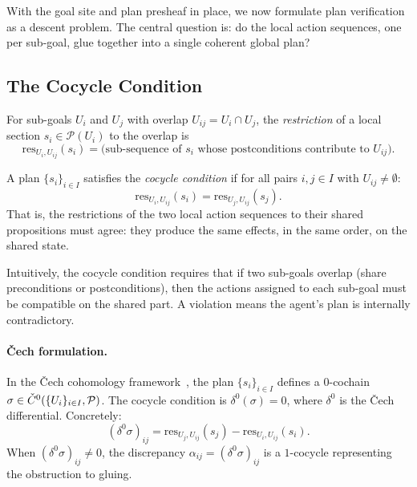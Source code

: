 \documentclass[11pt]{article}
\newcommand{\PlanSheaf}{\mathcal{P}}
\newcommand{\SubGoal}[1]{U_{#1}}
\newcommand{\CoverFam}{\{U_i\}_{i \in I}}
\newcommand{\PlanRes}{\mathrm{res}}
\begin{document}
With the goal site and plan presheaf in place, we now formulate
plan verification as a descent problem.  The central question is:
do the local action sequences, one per sub-goal, glue together
into a single coherent global plan?

\subsection{The Cocycle Condition}\label{ssec:cocycle}

\begin{definition}\label{def:restriction}
  For sub-goals $\SubGoal{i}$ and $\SubGoal{j}$ with overlap
  $\SubGoal{ij} = \SubGoal{i} \cap \SubGoal{j}$, the
  \emph{restriction} of a local section $s_i \in \PlanSheaf(\SubGoal{i})$
  to the overlap is
  \[
    \PlanRes_{\SubGoal{i}, \SubGoal{ij}}(s_i) =
    \text{(sub-sequence of $s_i$ whose postconditions contribute to
    $\SubGoal{ij}$)}.
  \]
\end{definition}

\begin{definition}\label{def:cocycle}
  A plan $\{s_i\}_{i \in I}$ satisfies the \emph{cocycle condition}
  if for all pairs $i, j \in I$ with $\SubGoal{ij} \neq \emptyset$:
  \[
    \PlanRes_{\SubGoal{i}, \SubGoal{ij}}(s_i) =
    \PlanRes_{\SubGoal{j}, \SubGoal{ij}}(s_j).
  \]
  That is, the restrictions of the two local action sequences to
  their shared propositions must agree: they produce the same
  effects, in the same order, on the shared state.
\end{definition}

Intuitively, the cocycle condition requires that if two sub-goals
overlap (share preconditions or postconditions), then the actions
assigned to each sub-goal must be compatible on the shared part.
A violation means the agent's plan is internally contradictory.

\paragraph{Čech formulation.}
In the Čech cohomology framework~\cite{paper03,paper43}, the plan
$\{s_i\}_{i \in I}$ defines a $0$-cochain
$\sigma \in \Cech^0(\CoverFam, \PlanSheaf)$.  The cocycle
condition is $\delta^0(\sigma) = 0$, where $\delta^0$ is the
Čech differential.  Concretely:
\[
  (\delta^0 \sigma)_{ij} =
  \PlanRes_{\SubGoal{j}, \SubGoal{ij}}(s_j) -
  \PlanRes_{\SubGoal{i}, \SubGoal{ij}}(s_i).
\]
When $(\delta^0 \sigma)_{ij} \neq 0$, the discrepancy
$\alpha_{ij} = (\delta^0 \sigma)_{ij}$ is a $1$-cocycle
representing the obstruction to gluing.
\end{document}

